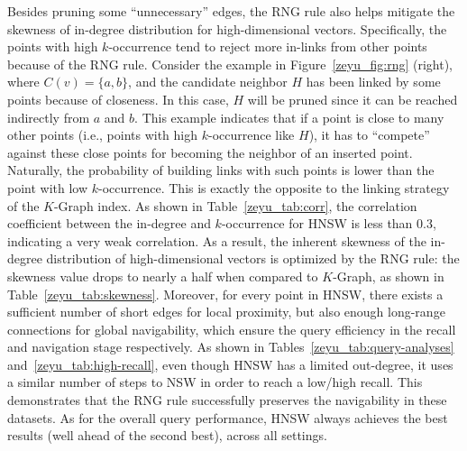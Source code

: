 \documentclass[11pt]{article}
\begin{document}
Besides pruning some ``unnecessary'' edges, the RNG rule also helps mitigate the skewness of in-degree distribution for high-dimensional vectors.
Specifically, the points with high $k$-occurrence tend to reject more in-links from other points because of the RNG rule.
Consider the example in Figure~\ref{zeyu_fig:rng} (right), where $C(v)=\{a,b\}$, and the candidate neighbor $H$ has been linked by some points because of closeness.
In this case, $H$ will be pruned since it can be reached indirectly from $a$ and $b$.
This example indicates that if a point is close to many other points (i.e., points with high $k$-occurrence like $H$), it has to ``compete'' against these close points for becoming the neighbor of an inserted point.
Naturally, the probability of building links with such points is lower than the point with low $k$-occurrence.
This is exactly the opposite to the linking strategy of the $K$-Graph index.
As shown in Table~\ref{zeyu_tab:corr}, the correlation coefficient between the in-degree and $k$-occurrence for HNSW is less than 0.3, indicating a very weak correlation.
As a result, the inherent skewness of the in-degree distribution of high-dimensional vectors is optimized by the RNG rule: the skewness value drops to nearly a half when compared to $K$-Graph, as shown in Table~\ref{zeyu_tab:skewness}. 
Moreover, for every point in HNSW, there exists a sufficient number of short edges for local proximity, but also enough long-range connections for global navigability, which ensure the query efficiency in the recall and navigation stage respectively.
As shown in Tables~\ref{zeyu_tab:query-analyses} and~\ref{zeyu_tab:high-recall}, even though HNSW has a limited out-degree, it uses a similar number of steps to NSW in order to reach a low/high recall.
This demonstrates that the RNG rule successfully preserves the navigability in these datasets.
As for the overall query performance, HNSW always achieves the best results (well ahead of the second best), across all settings.  
\end{document}
